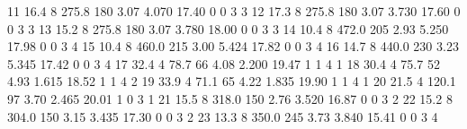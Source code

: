 \documentclass[
]{book}
\newenvironment{Shaded}{\begin{snugshade}}{\end{snugshade}}
\newcommand{\DecValTok}[1]{\textcolor[rgb]{0.00,0.00,0.81}{#1}}
\newcommand{\FloatTok}[1]{\textcolor[rgb]{0.00,0.00,0.81}{#1}}
\begin{document}
\begin{Shaded}
\begin{Highlighting}[]
\DecValTok{11}  \FloatTok{16.4}         \DecValTok{8}  \FloatTok{275.8}  \DecValTok{180}  \FloatTok{3.07}  \FloatTok{4.070}  \FloatTok{17.40}   \DecValTok{0}   \DecValTok{0}     \DecValTok{3}     \DecValTok{3}
\DecValTok{12}  \FloatTok{17.3}         \DecValTok{8}  \FloatTok{275.8}  \DecValTok{180}  \FloatTok{3.07}  \FloatTok{3.730}  \FloatTok{17.60}   \DecValTok{0}   \DecValTok{0}     \DecValTok{3}     \DecValTok{3}
\DecValTok{13}  \FloatTok{15.2}         \DecValTok{8}  \FloatTok{275.8}  \DecValTok{180}  \FloatTok{3.07}  \FloatTok{3.780}  \FloatTok{18.00}   \DecValTok{0}   \DecValTok{0}     \DecValTok{3}     \DecValTok{3}
\DecValTok{14}  \FloatTok{10.4}         \DecValTok{8}  \FloatTok{472.0}  \DecValTok{205}  \FloatTok{2.93}  \FloatTok{5.250}  \FloatTok{17.98}   \DecValTok{0}   \DecValTok{0}     \DecValTok{3}     \DecValTok{4}
\DecValTok{15}  \FloatTok{10.4}         \DecValTok{8}  \FloatTok{460.0}  \DecValTok{215}  \FloatTok{3.00}  \FloatTok{5.424}  \FloatTok{17.82}   \DecValTok{0}   \DecValTok{0}     \DecValTok{3}     \DecValTok{4}
\DecValTok{16}  \FloatTok{14.7}         \DecValTok{8}  \FloatTok{440.0}  \DecValTok{230}  \FloatTok{3.23}  \FloatTok{5.345}  \FloatTok{17.42}   \DecValTok{0}   \DecValTok{0}     \DecValTok{3}     \DecValTok{4}
\DecValTok{17}  \FloatTok{32.4}         \DecValTok{4}   \FloatTok{78.7}   \DecValTok{66}  \FloatTok{4.08}  \FloatTok{2.200}  \FloatTok{19.47}   \DecValTok{1}   \DecValTok{1}     \DecValTok{4}     \DecValTok{1}
\DecValTok{18}  \FloatTok{30.4}         \DecValTok{4}   \FloatTok{75.7}   \DecValTok{52}  \FloatTok{4.93}  \FloatTok{1.615}  \FloatTok{18.52}   \DecValTok{1}   \DecValTok{1}     \DecValTok{4}     \DecValTok{2}
\DecValTok{19}  \FloatTok{33.9}         \DecValTok{4}   \FloatTok{71.1}   \DecValTok{65}  \FloatTok{4.22}  \FloatTok{1.835}  \FloatTok{19.90}   \DecValTok{1}   \DecValTok{1}     \DecValTok{4}     \DecValTok{1}
\DecValTok{20}  \FloatTok{21.5}         \DecValTok{4}  \FloatTok{120.1}   \DecValTok{97}  \FloatTok{3.70}  \FloatTok{2.465}  \FloatTok{20.01}   \DecValTok{1}   \DecValTok{0}     \DecValTok{3}     \DecValTok{1}
\DecValTok{21}  \FloatTok{15.5}         \DecValTok{8}  \FloatTok{318.0}  \DecValTok{150}  \FloatTok{2.76}  \FloatTok{3.520}  \FloatTok{16.87}   \DecValTok{0}   \DecValTok{0}     \DecValTok{3}     \DecValTok{2}
\DecValTok{22}  \FloatTok{15.2}         \DecValTok{8}  \FloatTok{304.0}  \DecValTok{150}  \FloatTok{3.15}  \FloatTok{3.435}  \FloatTok{17.30}   \DecValTok{0}   \DecValTok{0}     \DecValTok{3}     \DecValTok{2}
\DecValTok{23}  \FloatTok{13.3}         \DecValTok{8}  \FloatTok{350.0}  \DecValTok{245}  \FloatTok{3.73}  \FloatTok{3.840}  \FloatTok{15.41}   \DecValTok{0}   \DecValTok{0}     \DecValTok{3}     \DecValTok{4}

\end{Highlighting}
\end{Shaded}
\end{document}
